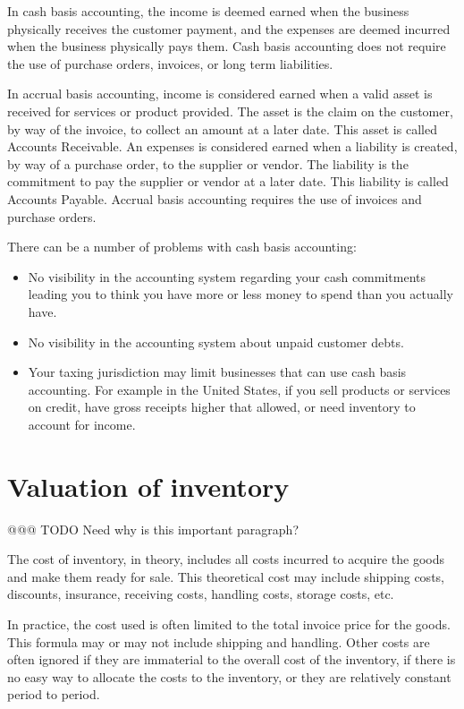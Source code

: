In \gls{cash basis} accounting, the income is deemed earned when the business physically
receives the customer payment, and the expenses are deemed incurred when the business
physically pays them. Cash basis accounting does not require the use of purchase orders,
invoices, or long term liabilities.

In \gls{accrual basis} accounting, income is considered earned when a valid asset is
received for services or product provided. The asset is the claim on the customer,
by way of the invoice, to collect an amount at a later date. This asset is called
Accounts Receivable. An expenses is considered earned when a liability is created,
by way of a purchase order, to the supplier or vendor. The liability is the commitment
to pay the supplier or vendor at a later date. This liability is called Accounts Payable.
Accrual basis accounting requires the use of invoices and purchase orders.

There can be a number of problems with \gls{cash basis} accounting:
\begin{itemize}
        \item No visibility in the accounting system regarding your cash commitments leading
        you to think you have more or less money to spend than you actually have.
        \item No visibility in the accounting system about unpaid customer debts.
        \item Your taxing jurisdiction may limit businesses that can use cash basis accounting.
        For example in the United States, if you sell products or services on credit,
        have gross receipts higher that allowed, or need inventory to account for income.
\end{itemize}

\section{Valuation of inventory}
\label{sec-accounting-valuation-inventory}

@@@ TODO Need why is this important paragraph?

The cost of inventory, in theory, includes all costs incurred to acquire the goods and make 
them ready for sale. This theoretical cost may include shipping costs, discounts, insurance, 
receiving costs, handling costs, storage costs, etc.

In practice, the cost used is often limited to the total invoice price for the goods.
This formula may or may not include shipping and handling.
Other costs are often ignored if they are immaterial to the overall cost of the inventory, if there
is no easy way to allocate the costs to the inventory, or they are relatively constant period to period.

